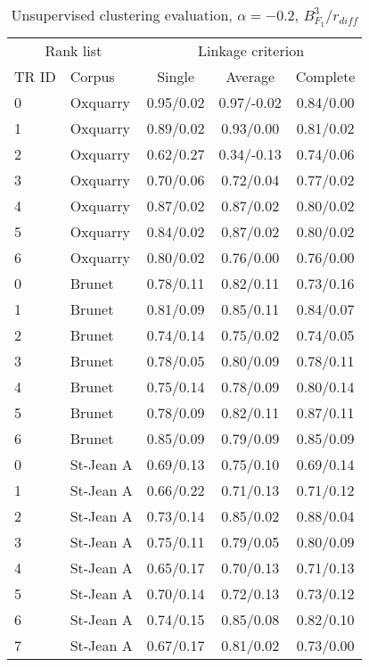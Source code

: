 \begin{table}
  \centering
  \caption{Unsupervised clustering evaluation, $\alpha = -0.2$, $B^3_{F_1}$/$r_{diff}$}
  \label{tab:unsupervised_clustering_alpha_full}

  \begin{tabular}{l l c c c}
    \toprule
    \multicolumn{2}{c}{Rank list} & \multicolumn{3}{c}{Linkage criterion} \\
    TR ID & Corpus & Single & Average & Complete \\
    \midrule
    0 & Oxquarry & 0.95/0.02 &  0.97/-0.02 & 0.84/0.00 \\
    1 & Oxquarry & 0.89/0.02 & 0.93/0.00 & 0.81/0.02 \\
    2 & Oxquarry & 0.62/0.27 &  0.34/-0.13 & 0.74/0.06 \\
    3 & Oxquarry & 0.70/0.06 & 0.72/0.04 & 0.77/0.02 \\
    4 & Oxquarry & 0.87/0.02 & 0.87/0.02 & 0.80/0.02 \\
    5 & Oxquarry & 0.84/0.02 & 0.87/0.02 & 0.80/0.02 \\
    6 & Oxquarry & 0.80/0.02 & 0.76/0.00 & 0.76/0.00 \\
    0 & Brunet & 0.78/0.11 & 0.82/0.11 & 0.73/0.16 \\
    1 & Brunet & 0.81/0.09 & 0.85/0.11 & 0.84/0.07 \\
    2 & Brunet & 0.74/0.14 & 0.75/0.02 & 0.74/0.05 \\
    3 & Brunet & 0.78/0.05 & 0.80/0.09 & 0.78/0.11 \\
    4 & Brunet & 0.75/0.14 & 0.78/0.09 & 0.80/0.14 \\
    5 & Brunet & 0.78/0.09 & 0.82/0.11 & 0.87/0.11 \\
    6 & Brunet & 0.85/0.09 & 0.79/0.09 & 0.85/0.09 \\
    0 & St-Jean A & 0.69/0.13 & 0.75/0.10 & 0.69/0.14 \\
    1 & St-Jean A & 0.66/0.22 & 0.71/0.13 & 0.71/0.12 \\
    2 & St-Jean A & 0.73/0.14 & 0.85/0.02 & 0.88/0.04 \\
    3 & St-Jean A & 0.75/0.11 & 0.79/0.05 & 0.80/0.09 \\
    4 & St-Jean A & 0.65/0.17 & 0.70/0.13 & 0.71/0.13 \\
    5 & St-Jean A & 0.70/0.14 & 0.72/0.13 & 0.73/0.12 \\
    6 & St-Jean A & 0.74/0.15 & 0.85/0.08 & 0.82/0.10 \\
    7 & St-Jean A & 0.67/0.17 & 0.81/0.02 & 0.73/0.00 \\

\end{tabular}
\end{table}
